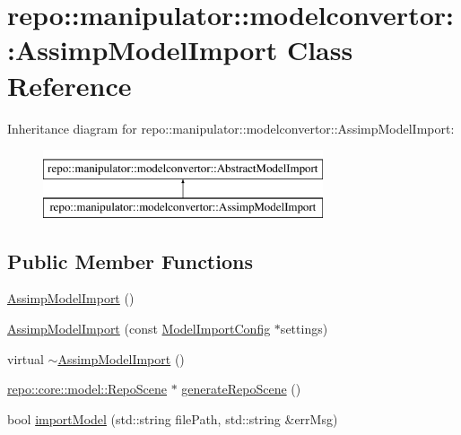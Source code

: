 \hypertarget{classrepo_1_1manipulator_1_1modelconvertor_1_1_assimp_model_import}{}\section{repo\+:\+:manipulator\+:\+:modelconvertor\+:\+:Assimp\+Model\+Import Class Reference}
\label{classrepo_1_1manipulator_1_1modelconvertor_1_1_assimp_model_import}
Inheritance diagram for repo\+:\+:manipulator\+:\+:modelconvertor\+:\+:Assimp\+Model\+Import\+:\begin{figure}[H]
\begin{center}
\leavevmode
\includegraphics[height=2.000000cm]{classrepo_1_1manipulator_1_1modelconvertor_1_1_assimp_model_import}
\end{center}
\end{figure}
\subsection*{Public Member Functions}
\begin{DoxyCompactItemize}
\item 
\hyperlink{classrepo_1_1manipulator_1_1modelconvertor_1_1_assimp_model_import_a3d09c442384d4767b270384c9c9d8218}{Assimp\+Model\+Import} ()
\item 
\hyperlink{classrepo_1_1manipulator_1_1modelconvertor_1_1_assimp_model_import_abe3f60cfeb876fddc1752c13bf8f7616}{Assimp\+Model\+Import} (const \hyperlink{classrepo_1_1manipulator_1_1modelconvertor_1_1_model_import_config}{Model\+Import\+Config} $\ast$settings)
\item 
virtual \hyperlink{classrepo_1_1manipulator_1_1modelconvertor_1_1_assimp_model_import_acf7e9f1c6156170c92cb96d48853b6a7}{$\sim$\+Assimp\+Model\+Import} ()
\item 
\hyperlink{classrepo_1_1core_1_1model_1_1_repo_scene}{repo\+::core\+::model\+::\+Repo\+Scene} $\ast$ \hyperlink{classrepo_1_1manipulator_1_1modelconvertor_1_1_assimp_model_import_a5e51038056aee890d4860190ce8d5847}{generate\+Repo\+Scene} ()
\item 
bool \hyperlink{classrepo_1_1manipulator_1_1modelconvertor_1_1_assimp_model_import_aefdfec79f7be00e1ad452ee22555b64a}{import\+Model} (std\+::string file\+Path, std\+::string \&err\+Msg)
\end{DoxyCompactItemize}
